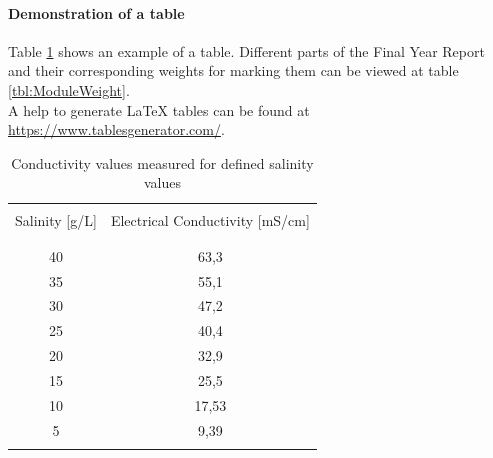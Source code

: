 \paragraph{Demonstration of a table}
Table \ref{tbl:Salinity-EC} shows an example of a table. Different parts of the Final Year Report and their corresponding weights for marking them can be viewed at table \ref{tbl:ModuleWeight}.\\
A help to generate LaTeX tables can be found at \url{https://www.tablesgenerator.com/}.
\begin{table}
	\begin{center}
		\caption{\label{tbl:Salinity-EC}Conductivity values measured for defined salinity values}
		\begin{tabular}{cc}
			\hline \\
			Salinity [g/L]	& 	Electrical Conductivity [mS/cm]\\    
			\\
			\hline \\
			40	&	63,3	\\
			35	&	55,1	\\
			30	&	47,2	\\
			25	&	40,4	\\
			20	&	32,9	\\
			15	&	25,5	\\
			10	&	17,53	\\
			5	&	9,39	\\
			\hline \\
		\end{tabular}  
	\end{center}
\end{table}

